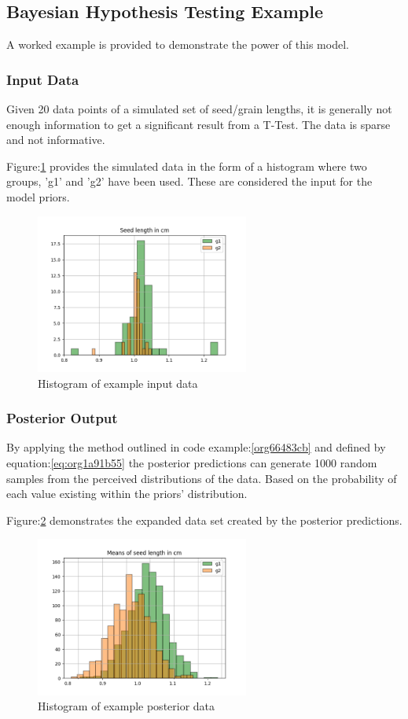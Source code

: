\documentclass[11pt]{report}
\begin{document}
\subsection{Bayesian Hypothesis Testing Example}
\label{sec:org4e05358}
A worked example is provided to demonstrate the power of this model.
\subsubsection{Input Data}
\label{sec:org1f62cf8}
Given 20 data points of a simulated set of seed/grain lengths, it is generally not enough information to get a significant result from a T-Test. The data is sparse and not informative.

Figure:\ref{fig:org67df843} provides the simulated data in the form of a histogram where two groups, 'g1' and 'g2' have been used. These are considered the input for the model priors.
\begin{figure}[htbp]
\centering
\includegraphics[width=7cm]{./images/exampledata.png}
\caption{\label{fig:org67df843}
Histogram of example input data}
\end{figure}

\subsubsection{Posterior Output}
\label{sec:org3738f0e}
By applying the method outlined in code example:\ref{org66483cb} and defined by equation:\ref{eq:org1a91b55} the posterior predictions can generate 1000 random samples from the perceived distributions of the data. Based on the probability of each value existing within the priors' distribution.

Figure:\ref{fig:orgea5c256} demonstrates the expanded data set created by the posterior predictions.
\begin{figure}[htbp]
\centering
\includegraphics[width=7cm]{./images/examplebayes.png}
\caption{\label{fig:orgea5c256}
Histogram of example posterior data}
\end{figure}
\end{document}

